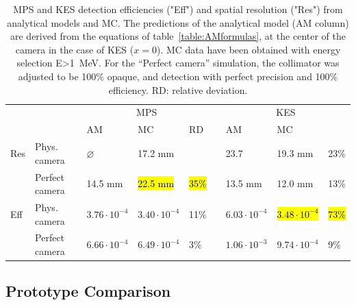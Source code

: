 \documentclass[a4paper,english,12pt]{article}
\begin{document}
\begin{table}[h]
\centering
\begin{tabular}{lllllllll}
	\midrule
	\multicolumn{2}{c}{}				& \multicolumn{3}{c}{MPS}																	&& \multicolumn{3}{c}{KES}										\\
	\cline{3-5}\cline{7-9}
	\multicolumn{2}{c}{}				& AM 										& MC 									& RD	 			&& AM 										& MC								\\
	\midrule
	Res	& Phys. camera					& $\varnothing$					& 17.2 mm 	 					&						&& 23.7									& 19.3 mm									& 23\% \\
			& Perfect camera				& 14.5 mm								& \hl{22.5 mm} 	 			& \hl{35\%}	&& 13.5 mm								& 12.0 mm									& 13\%  \\
	\midrule
	Eff & Phys. camera				&  $3.76 \cdot 10^{-4}$	& $3.40\cdot10^{-4}$	&	11\%					&& $6.03 \cdot 10^{-4}$	& \hl{$3.48\cdot10^{-4}$}	& \hl{73\%}\\
	    & Perfect camera			&  $6.66 \cdot 10^{-4}$ & $6.49\cdot10^{-4}$	&	3\%					&& $1.06 \cdot 10^{-3}$  & $9.74\cdot10^{-4}$			& 9\%\\
 	\midrule
\end{tabular}
\caption{MPS and KES detection efficiencies ("Eff") and spatial resolution ("Res") from analytical models and MC. The predictions of the analytical model (AM column) are derived from the equations of table~\ref{table:AMformulas}, at the center of the camera in the case of KES ($x=0$). MC data have been obtained with energy selection E>1~MeV. For the \enquote{Perfect camera} simulation, the collimator was adjusted to be 100\% opaque, and detection with perfect precision and 100\% efficiency. RD: relative deviation.}
\label{tab:AMV}
\end{table}



\subsection{Prototype Comparison}
\end{document}
